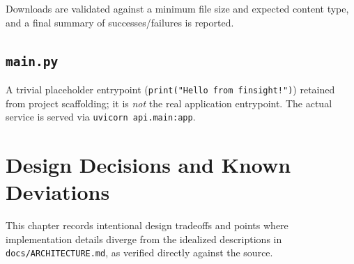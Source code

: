 \documentclass[11pt,a4paper]{report}
\newcommand{\code}[1]{\texttt{#1}}
\newcommand{\file}[1]{\texttt{\small #1}}
\begin{document}
Downloads are validated against a minimum file size and expected content type, and a
final summary of successes/failures is reported.

\section{\file{main.py}}

A trivial placeholder entrypoint (\code{print("Hello from finsight!")}) retained from
project scaffolding; it is \emph{not} the real application entrypoint. The actual
service is served via \code{uvicorn api.main:app}.

\chapter{Design Decisions and Known Deviations}

This chapter records intentional design tradeoffs and points where implementation
details diverge from the idealized descriptions in \file{docs/ARCHITECTURE.md}, as
verified directly against the source.
\end{document}
